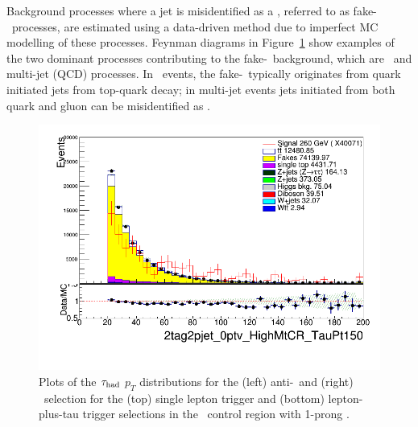 Background processes where a jet is misidentified as a \tauhad, 
referred to as fake-\tauhad\ processes, 
are estimated using a data-driven method due to imperfect MC modelling of these processes.
Feynman diagrams in Figure~\ref{fig:fakes:feynman} 
show examples of the two dominant processes contributing to the fake-\tauhad\ background,
which are \ttbar\ and multi-jet (QCD) processes. 
In \ttbar\ events, the fake-\tauhad\ typically originates from quark initiated jets from 
top-quark decay; in multi-jet events jets initiated from both quark and gluon can be
misidentified as \tauhad. 
\begin{figure}[htbp]
\centering
\includegraphics[width=.45\textwidth]{DiHiggs/plots/lephadFF/SLT/2tag2pjet_0ptv_HighMtCR_TauPt150_CR_SLT_ALL_ttWeight_1.png}
\caption{Plots of the $\tau_{\mathrm{had}}$ $p_T$ distributions for the (left) anti-\tauhad\ and (right) \tauhad\ selection for the (top) single lepton trigger and (bottom) lepton-plus-tau trigger selections in the \ttbar\ control region with 1-prong \tauhad.}
\label{fig:fakes:feynman}
\end{figure} 

